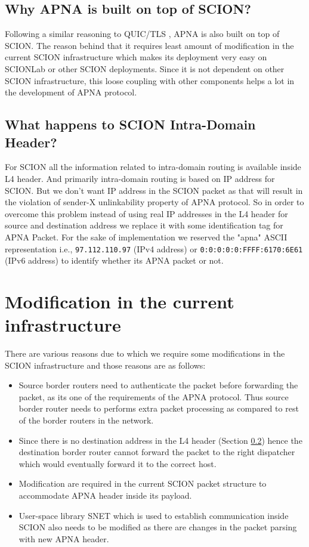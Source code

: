 \subsection{Why APNA is built on top of SCION?}
Following a similar reasoning to QUIC/TLS \cite{quic} \cite{tls}, APNA is also built on top of SCION. The reason behind that it requires least amount of modification in the current SCION infrastructure which makes its deployment very easy on SCIONLab or other SCION deployments. Since it is not dependent on other SCION infrastructure, this loose coupling with other components helps a lot in the development of APNA protocol.

\subsection{What happens to SCION Intra-Domain Header?} \label{overlay:miss_l4}
For SCION all the information related to intra-domain routing is available inside L4 header. And primarily intra-domain routing is based on IP address for SCION. But we don't want IP address in the SCION packet as that will result in the violation of sender-X unlinkability property of APNA protocol. So in order to overcome this problem instead of using real IP addresses in the L4 header for source and destination address we replace it with some identification tag for APNA Packet. For the sake of implementation we reserved the "apna" ASCII representation i.e., \texttt{97.112.110.97} (IPv4 address) or \texttt{0:0:0:0:0:FFFF:6170:6E61} (IPv6 address) to identify whether its APNA packet or not.

\section{Modification in the current infrastructure} \label{overlay:modifications}
There are various reasons due to which we require some modifications in the SCION infrastructure and those reasons are as follows:
\begin{itemize}
    \item Source border routers need to authenticate the packet before forwarding the packet, as its one of the requirements of the APNA protocol. Thus source border router needs to performs extra packet processing as compared to rest of the border routers in the network.
    \item Since there is no destination address in the L4 header (Section \ref{overlay:miss_l4}) hence the destination border router cannot forward the packet to the right dispatcher which would eventually forward it to the correct host.
    \item Modification are required in the current SCION packet structure to accommodate APNA header inside its payload.
    \item User-space library SNET which is used to establish communication inside SCION also needs to be modified as there are changes in the packet parsing with new APNA header.
\end{itemize}

